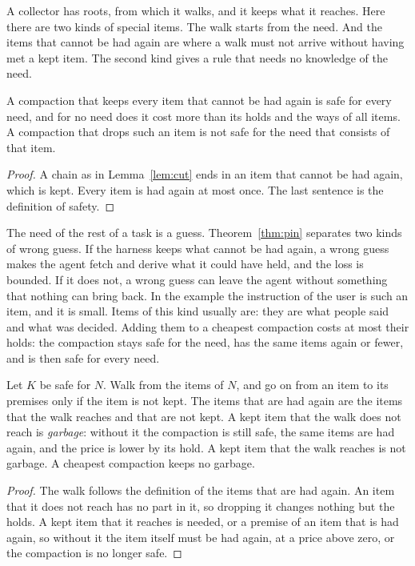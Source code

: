 \documentclass[acmsmall,nonacm,screen]{acmart}
\begin{document}
A collector has roots, from which it walks, and it keeps what it reaches. Here there are two
kinds of special items. The walk starts from the need. And the items that cannot be had
again are where a walk must not arrive without having met a kept item. The second kind
gives a rule that needs no knowledge of the need.

\begin{theorem}\label{thm:pin}
A compaction that keeps every item that cannot be had again is safe for every need, and for
no need does it cost more than its holds and the ways of all items. A compaction that drops
such an item is not safe for the need that consists of that item.
\end{theorem}

\begin{proof}
A chain as in Lemma~\ref{lem:cut} ends in an item that cannot be had again, which is kept.
Every item is had again at most once. The last sentence is the definition of safety.
\end{proof}

The need of the rest of a task is a guess. Theorem~\ref{thm:pin} separates two kinds of
wrong guess. If the harness keeps what cannot be had again, a wrong guess makes the agent
fetch and derive what it could have held, and the loss is bounded. If it does not, a wrong
guess can leave the agent without something that nothing can bring back. In the example the
instruction of the user is such an item, and it is small. Items of this kind usually are:
they are what people said and what was decided. Adding them to a cheapest compaction costs
at most their holds: the compaction stays safe for the need, has the same items again or
fewer, and is then safe for every need.

\begin{proposition}[Garbage]\label{prop:garbage}
Let $K$ be safe for $N$. Walk from the items of $N$, and go on from an item to its premises
only if the item is not kept. The items that are had again are the items that the walk
reaches and that are not kept. A kept item that the walk does not reach is \emph{garbage}:
without it the compaction is still safe, the same items are had again, and the price is
lower by its hold. A kept item that the walk reaches is not garbage. A cheapest compaction
keeps no garbage.
\end{proposition}

\begin{proof}
The walk follows the definition of the items that are had again. An item that it does not
reach has no part in it, so dropping it changes nothing but the holds. A kept item that it
reaches is needed, or a premise of an item that is had again, so without it the item itself
must be had again, at a price above zero, or the compaction is no longer safe.
\end{proof}
\end{document}
